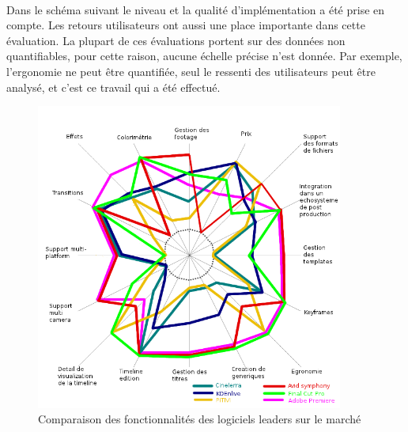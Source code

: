 \paragraph{} Dans le schéma suivant le niveau et la qualité
d'implémentation a été prise en compte. Les retours utilisateurs
ont aussi une place importante dans cette évaluation. La plupart
de ces évaluations portent sur des données non quantifiables, pour
cette raison, aucune échelle précise n'est donnée.  Par exemple,
l'ergonomie ne peut être quantifiée, seul le ressenti des utilisateurs
peut être analysé, et c'est ce travail qui a été effectué.

\begin{figure} [H]

  \begin{center}

    \includegraphics[width=0.9\textwidth]{images/spiderDiagramFeaturesComparision}

  \end{center}

  \caption{Comparaison des fonctionnalités des logiciels leaders sur
  le marché}

  \label{Yes}

\end{figure}

\paragraph {}

